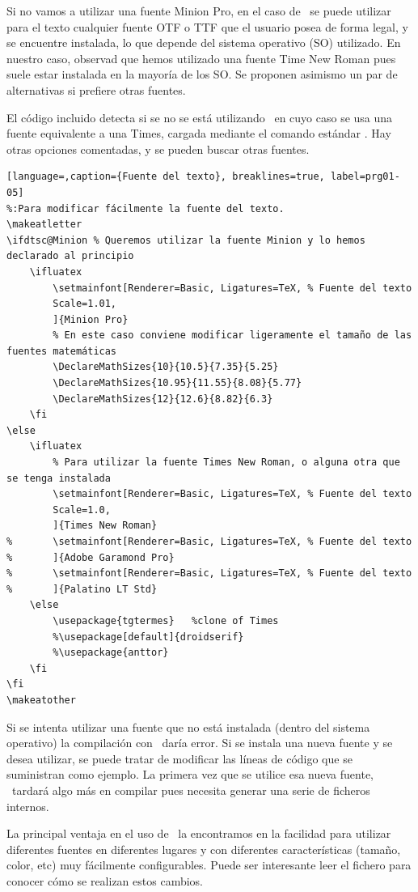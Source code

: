 Si no vamos a utilizar una fuente Minion Pro, en el caso de \LuaLaTeX\ se puede utilizar para el texto cualquier fuente OTF o TTF que el usuario posea de forma legal, y se encuentre instalada, lo que depende del sistema operativo (SO) utilizado. En nuestro caso, observad que hemos utilizado una fuente Time New Roman  pues suele estar instalada en la mayoría de los SO. Se proponen asimismo un par de alternativas si prefiere otras fuentes.
 
El código incluido detecta si se no se está utilizando \LuaLaTeX\, en cuyo caso se usa una fuente equivalente a una Times, cargada mediante el comando estándar . Hay otras opciones comentadas, y se pueden buscar otras fuentes. 
 
\begin{lstlisting}[language=,caption={Fuente del texto}, breaklines=true, label=prg01-05]
%:Para modificar fácilmente la fuente del texto. 
\makeatletter
\ifdtsc@Minion % Queremos utilizar la fuente Minion y lo hemos declarado al principio
	\ifluatex
		\setmainfont[Renderer=Basic, Ligatures=TeX,	% Fuente del texto 
		Scale=1.01,
		]{Minion Pro}
   		% En este caso conviene modificar ligeramente el tamaño de las fuentes matemáticas
		\DeclareMathSizes{10}{10.5}{7.35}{5.25}
		\DeclareMathSizes{10.95}{11.55}{8.08}{5.77}
		\DeclareMathSizes{12}{12.6}{8.82}{6.3}
	\fi
\else
	\ifluatex
		% Para utilizar la fuente Times New Roman, o alguna otra que se tenga instalada
		\setmainfont[Renderer=Basic, Ligatures=TeX,	% Fuente del texto 
		Scale=1.0,
		]{Times New Roman}
%		\setmainfont[Renderer=Basic, Ligatures=TeX,	% Fuente del texto 
%		]{Adobe Garamond Pro}
%		\setmainfont[Renderer=Basic, Ligatures=TeX,	% Fuente del texto 
%		]{Palatino LT Std}
	\else
		\usepackage{tgtermes} 	%clone of Times
		%\usepackage[default]{droidserif}
		%\usepackage{anttor} 	
	\fi
\fi
\makeatother
\end{lstlisting}

Si se intenta utilizar una fuente que no está instalada (dentro del sistema operativo) la compilación con \LuaLaTeX\ daría error. Si se instala una nueva fuente y se desea utilizar, se puede tratar de modificar las líneas de código que se suministran como ejemplo. La primera vez que se utilice esa nueva fuente, \LuaLaTeX\ tardará algo más en compilar pues necesita generar una serie de ficheros internos.

La principal ventaja en el uso de \LuaLaTeX\ la encontramos en la facilidad para utilizar diferentes fuentes en diferentes lugares y con diferentes características (tamaño, color, etc) muy fácilmente configurables. Puede ser interesante leer el fichero  para conocer cómo se realizan estos cambios. 

